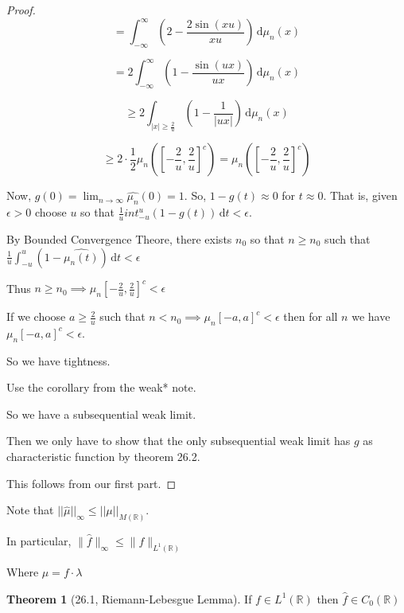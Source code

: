 \documentclass{article}
\theoremstyle{definition}
\newtheorem{theorem}{Theorem}
\begin{document}
\begin{proof}
    \[
        = \int_{-\infty}^{\infty} \left( 2 - \frac{2 \sin (xu)}{xu} \right)  \,\mathrm{d}\mu_n(x) 
    \]

    \[
        = 2 \int_{-\infty}^{\infty} \left( 1 - \frac{\sin (ux)}{ux} \right)  \,\mathrm{d}\mu_n(x)
    \]

    \[
        \geq 2 \int_{\vert x \vert \geq \frac{2}{u} }^{} \left( 1 - \frac{1}{\vert ux \vert } \right)  \,\mathrm{d}\mu _n(x) 
    \]

    \[
        \geq 2\cdot \frac{1}{2} \mu_n \left( \left[ - \frac{2}{u}, \frac{2}{u} \right] ^c \right) = \mu_n \left( \left[ - \frac{2}{u}, \frac{2}{u} \right] ^c \right)
    \]

    Now, \(g(0)=\lim_{n \to \infty} \hat{\mu_n}(0)=1\). So, \(1-g(t)\approx 0\) for \(t\approx 0\). That is, given \(\epsilon > 0\) choose \(u\) so that \(\frac{1}{u} int_{-u}^{u} (1-g(t)) \,\mathrm{d}t < \epsilon\).

    By Bounded Convergence Theore, there exists \(n_0\) so that \(n \geq n_0\) such that \(\frac{1}{u}\int_{-u}^{u} (1 - \hat{\mu_n(t)}) \,\mathrm{d}t < \epsilon \) 

    Thus \(n \geq n_0 \implies \mu_n[-\frac{2}{u},\frac{2}{u}]^c < \epsilon\) 

    If we choose \(a \geq \frac{2}{u}\) such that \(n < n_0 \implies \mu _n[-a,a]^c < \epsilon\) then for all \(n\) we have \(\mu_n[-a,a]^c < \epsilon\).

    So we have tightness.

    Use the corollary from the weak* note.

    So we have a subsequential weak limit.

    Then we only have to show that the only subsequential weak limit has \(g\) as characteristic function by theorem 26.2.

    This follows from our first part.

\end{proof}

Note that \(\vert \vert \hat{\mu} \vert  \vert_{\infty} \leq \vert \vert \mu  \vert  \vert_{M(\mathbb{R})}  \).

In particular, \(\lVert \hat{f} \rVert_{\infty} \leq \lVert f \rVert _{L^1(\mathbb{R})}\) 

Where \(\mu  = f\cdot \lambda\) 

\begin{theorem}
    [26.1, Riemann-Lebesgue Lemma]
    
    If \(f \in L^1(\mathbb{R})\) then \(\hat{f}\in C_0(\mathbb{R})\)  
\end{theorem}
\end{document}
